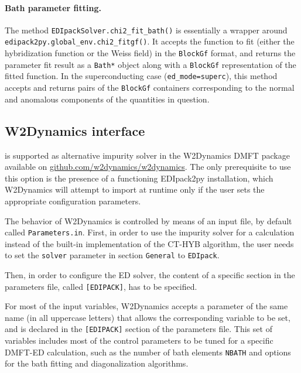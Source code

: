 \documentclass[edipack_sp.tex]{subfiles}
\begin{document}
\paragraph{{\bf Bath parameter fitting}.}
The method {\tt EDIpackSolver.chi2\_fit\_bath()} is essentially a wrapper around
{\tt edipack2py.global\_env.chi2\_fitgf()}. It accepts the function to fit (either
the hybridization function or the Weiss field) in the {\tt BlockGf} format,
and returns the parameter fit result as a {\tt Bath*} object along with a
{\tt BlockGf} representation of the fitted function. In the superconducting
case ({\tt ed\_mode=superc}), this method accepts and returns pairs of
the {\tt BlockGf} containers corresponding to the normal and anomalous 
components of the quantities in question.






\subsection{W2Dynamics interface}\label{sSecInteropW2DYN}
\NAME is supported as alternative impurity solver in the W2Dynamics DMFT package~\cite{Wallerberger2019CPC} available on \href{https://github.com/w2dynamics/w2dynamics}{github.com/w2dynamics/w2dynamics}. The only prerequisite to use this option is the presence of a functioning EDIpack2py installation, which W2Dynamics will attempt to import at runtime only if the user sets the appropriate configuration parameters.

The  behavior of W2Dynamics is controlled by means of an input file, by default called
{\tt Parameters.in}.
First, in order to use the \NAME impurity solver for a calculation instead of the built-in implementation of the CT-HYB algorithm, the user needs to set the {\tt solver} parameter in section {\tt General} to {\tt EDIpack}. 

Then, in order to configure the ED solver, the content of a specific section in the parameters file, called {\tt [EDIPACK]}, has to be specified.

For most of the \NAME input variables, W2Dynamics accepts a parameter of the same name (in all uppercase letters) that allows the corresponding variable to be set, and is declared in the {\tt [EDIPACK]} section of the parameters file. This set of variables includes most of the control parameters to be tuned for a specific DMFT-ED calculation, such as the number of bath elements {\tt NBATH} and options for the bath fitting and diagonalization algorithms. 
\end{document}
